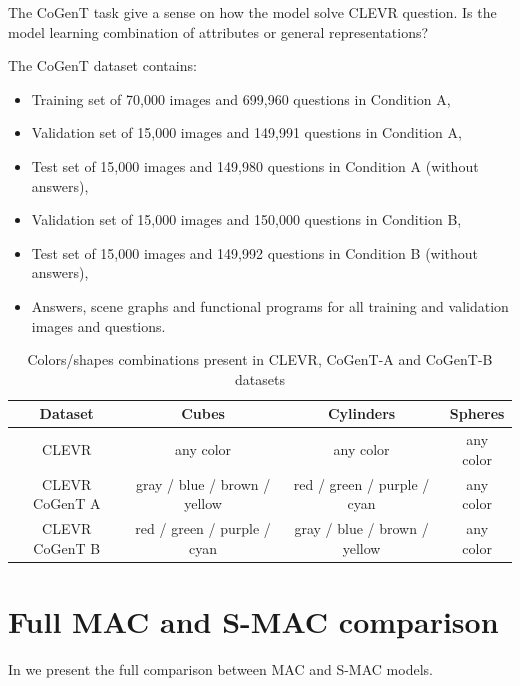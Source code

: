 The CoGenT task give a sense on how the model solve CLEVR question. Is the model learning combination of attributes or general representations?

The CoGenT dataset contains:
\begin{itemize}
\item	Training set of 70,000 images and 699,960 questions in Condition A,
\item	Validation set of 15,000 images and 149,991 questions in Condition A,
\item	Test set of 15,000 images and 149,980 questions in Condition A (without answers),
\item	Validation set of 15,000 images and 150,000 questions in Condition B,
\item	Test set of 15,000 images and 149,992 questions in Condition B (without answers),
\item	Answers, scene graphs and functional programs for all training and validation images and questions.
\end{itemize}

\begin{table}[h!]
	\centering
	\begin{tabular}{cccc}
		\toprule
		Dataset        & Cubes              & Cylinders &  Spheres         \\
		\midrule
		CLEVR   &  any color &  any color        &    any color    \\
		CLEVR CoGenT A & gray / blue / brown / yellow  & red / green / purple / cyan       &    any color  \\
		CLEVR CoGenT B  & red / green / purple / cyan &   gray / blue / brown / yellow       &      any color  \\
		\bottomrule
	\end{tabular}
	\caption{Colors/shapes combinations present in CLEVR, CoGenT-A and CoGenT-B datasets}
	\label{tab:cogent_conditions}
\end{table}

 
\section{Full MAC and S-MAC comparison}

In  we present the full comparison between MAC and S-MAC models.


